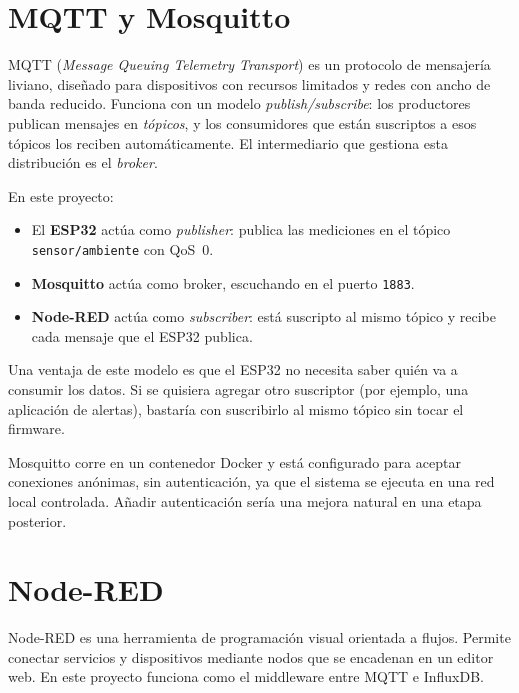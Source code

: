 \documentclass[12pt, a4paper]{article}
\begin{document}
\section{MQTT y Mosquitto}

MQTT (\textit{Message Queuing Telemetry Transport}) es un protocolo de mensajería
liviano, diseñado para dispositivos con recursos limitados y redes con ancho de banda
reducido. Funciona con un modelo \textit{publish/subscribe}: los productores publican
mensajes en \textit{tópicos}, y los consumidores que están suscriptos a esos tópicos
los reciben automáticamente. El intermediario que gestiona esta distribución es el
\textit{broker}.

En este proyecto:

\begin{itemize}
    \item El \textbf{ESP32} actúa como \textit{publisher}: publica las mediciones en
          el tópico \texttt{sensor/ambiente} con QoS~0.
    \item \textbf{Mosquitto} actúa como broker, escuchando en el puerto \texttt{1883}.
    \item \textbf{Node-RED} actúa como \textit{subscriber}: está suscripto al mismo
          tópico y recibe cada mensaje que el ESP32 publica.
\end{itemize}

Una ventaja de este modelo es que el ESP32 no necesita saber quién va a consumir los
datos. Si se quisiera agregar otro suscriptor (por ejemplo, una aplicación de
alertas), bastaría con suscribirlo al mismo tópico sin tocar el firmware.

Mosquitto corre en un contenedor Docker y está configurado para aceptar conexiones
anónimas, sin autenticación, ya que el sistema se ejecuta en una red local controlada.
Añadir autenticación sería una mejora natural en una etapa posterior.

\section{Node-RED}

Node-RED es una herramienta de programación visual orientada a flujos. Permite
conectar servicios y dispositivos mediante nodos que se encadenan en un editor web.
En este proyecto funciona como el middleware entre MQTT e InfluxDB.
\end{document}
